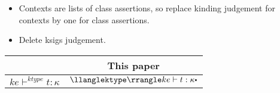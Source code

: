 \begin{itemize}
    \item Contexts are lists of class assertions, so replace kinding judgement for contexts by one for class assertions.
    \item Delete ksigs judgement.
\end{itemize}

\begin{center}
  \begin{tabular}{cc}
    \toprule
    \citet{Faxen2002staticsemantics} & This paper \\
    \midrule
    $ke \vdash^{ktype} t : \kappa$ & $\jdgmtname{ktype} ke \vdash t \specialcolon \kappa \sqcdot$ \\
    \bottomrule
  \end{tabular}
\end{center}
